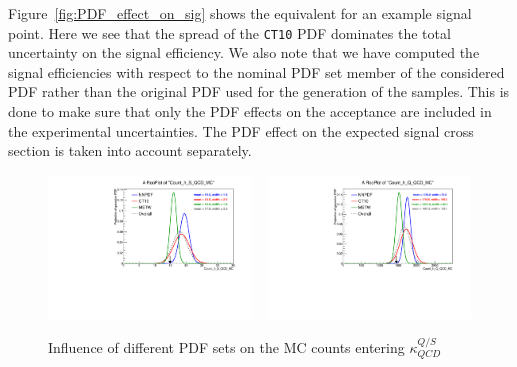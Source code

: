Figure~\ref{fig:PDF_effect_on_sig} shows the equivalent for an example signal point. Here we see
that the spread of the {\tt CT10} PDF dominates the total uncertainty on the signal efficiency. 
We also note that we have computed the signal efficiencies with respect to the nominal PDF set
member of the considered PDF rather than the original PDF used for the generation of the samples.
This is done to make sure that only the PDF effects on the acceptance are included in the
experimental uncertainties. The PDF effect on the expected signal cross section is taken into
account separately.

\begin{figure}[htpb]
\centering
\includegraphics[width=0.48\textwidth,clip=true,trim=0 0.2cm 0 1.2cm]
{figures/razor_systematics/h_S_QCD_MC}
~
\includegraphics[width=0.48\textwidth,clip=true,trim=0 0.2cm 0 1.2cm]
{figures/razor_systematics/h_Q_QCD_MC}
\caption{Influence of different PDF sets on the MC counts entering $\kappa_{QCD}^{Q/S}$
\label{fig:PDF_effect_on_bg_QCD}}
\end{figure}

